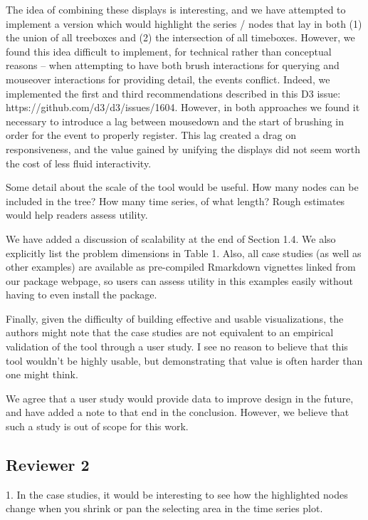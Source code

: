 \documentclass{article}
\begin{document}
\color{black}
The idea of combining these displays is interesting, and we have attempted to
implement a version which would highlight the series / nodes that lay in both
(1) the union of all treeboxes and (2) the intersection of all timeboxes.
However, we found this idea difficult to implement, for technical rather than
conceptual reasons -- when attempting to have both brush interactions for
querying and mouseover interactions for providing detail, the events conflict.
Indeed, we implemented the first and third recommendations described in this D3
issue: https://github.com/d3/d3/issues/1604. However, in both approaches we
found it necessary to introduce a lag between mousedown and the start of
brushing in order for the event to properly register. This lag created a drag on
responsiveness, and the value gained by unifying the displays did not seem worth
the cost of less fluid interactivity.

\color{blue} Some detail about the scale of the tool would be useful. How many nodes
  can be included in the tree? How many time series, of what length? Rough
  estimates would help readers assess utility.

\color{black}
We have added a discussion of scalability at the end of Section 1.4. We also
explicitly list the problem dimensions in Table 1. Also, all case studies (as
well as other examples) are available as pre-compiled Rmarkdown vignettes linked
from our package webpage, so users can assess utility in this examples easily
without having to even install the package.

\color{blue} Finally, given the difficulty of building effective and usable
  visualizations, the authors might note that the case studies are not
  equivalent to an empirical validation of the tool through a user study. I see
  no reason to believe that this tool wouldn't be highly usable, but
  demonstrating that value is often harder than one might think.

\color{black}
We agree that a user study would provide data to improve design in the future,
and have added a note to that end in the conclusion. However, we believe that
such a study is out of scope for this work.

\subsection{Reviewer 2}

\color{blue} 1. In the case studies, it would be interesting to see how the highlighted
  nodes change when you shrink or pan the selecting area in the time series
  plot.
\end{document}
